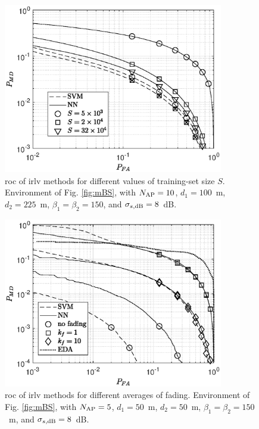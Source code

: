 \documentclass[final,twocolumn]{IEEEtran}
\begin{document}
\begin{figure}[t]
    \centering
    \includegraphics[width=9.6cm]{res_training_10BS_2Class_newArea.eps}
    \caption{\ac{roc} of \ac{irlv} methods for different values of training-set size $S$. Environment of Fig. \ref{fig:mBS}, with  $N_{\rm AP}=10$, $d_1 = 100$~m, $d_2 = 225$~m, $\beta_1 = \beta_2 = 150$, and $\sigma_{s,{\rm dB}} = 8$~dB.}
    \label{fig:kf1_newArea}
\end{figure}


\begin{figure}[t]
    \centering
    \includegraphics[width=9.6cm]{res_fading_5BS_2Class.eps}
    \caption{\ac{roc} of \ac{irlv} methods for different averages of fading. Environment of Fig. \ref{fig:mBS}, with  $N_{\rm AP}=5$, $d_1 = 50 $~m, $d_2 = 50$~m, $\beta_1 = \beta_2 = 150$~m, and $\sigma_{s,{\rm dB}} = 8$~dB.}
    \label{fig:kf10-5}
\end{figure}
\end{document}
